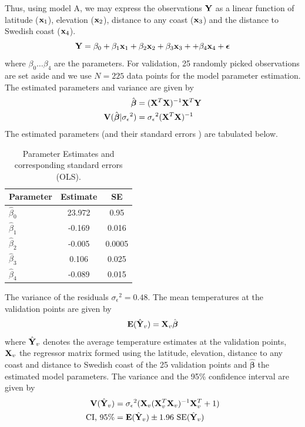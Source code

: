 \documentclass[a4paper,10pt]{article}
\def\bY{{\bf Y}}
\def\bX{{\bf X}}
\def\bE{{\bf E}}
\def\bV{{\bf V}}
\def\bx{{\bf x}}
\def\bbeta{{\boldsymbol \beta}}
\def\sigmaeps{{\sigma_{\epsilon}}}
\begin{document}
Thus, using model A, we may express the observations $\bY$ as a linear function of latitude ($\bx_1$), elevation ($\bx_2$), distance to any coast ($\bx_3$) and the distance to Swedish coast ($\bx_4$).
\begin{equation}
 \bY = \beta_0 + \beta_1 \bx_1 + \beta_2 \bx_2 + \beta_3 \bx_3 + + \beta_4 \bx_4 + {\boldsymbol \epsilon}
\end{equation}
where $\beta_0 \dots \beta_4$ are the parameters. For  validation, 25 randomly picked observations are set aside and we use $N = 225$ data points for the model parameter estimation. The estimated parameters and variance are given by
\begin{align*}
\hat \bbeta &= (\bX^T \bX)^{-1} \bX^T \bY\\
\bV(\hat \bbeta | \sigmaeps^2) &= \sigmaeps^2 (\bX^T \bX)^{-1}
\end{align*}
 The estimated parameters (and their standard errors ) are tabulated below.
\begin{table}[H]
\centering
\begin{tabular}{lcc}
\hline
{\bf Parameter} & {\bf Estimate} & {\bf SE }\\
\hline
$\hat \beta_0$ & 23.972 & 0.95 \\
$\hat \beta_1$ & -0.169 & 0.016\\
$\hat \beta_2$ & -0.005 & 0.0005 \\
$\hat \beta_3$ & 0.106 & 0.025\\
$\hat \beta_4$ & -0.089 & 0.015\\
\hline
\end{tabular}
\caption{Parameter Estimates and corresponding standard errors (OLS).}
\label{tab:olsest}
\end{table}
The variance of the residuals $\sigmaeps^2 = 0.48$. The mean temperatures at the validation points are given by
\begin{equation}
\bE(\hat \bY_v) = \bX_v \hat \bbeta
\end{equation}
where $\hat \bY_v$ denotes the average temperature estimates at the validation points, $\bX_v$  the regressor matrix formed using the latitude, elevation, distance to any coast and distance to Swedish coast of the 25 validation points and $\hat \bbeta$ the estimated model parameters. The variance and the 95\% confidence interval are given by
\begin{align*}
\bV(\hat \bY_v) &= \sigmaeps^2 (\bX_v (\bX_v^T\bX_v)^{-1} \bX_v^T + 1) \\
\text{CI, 95\%} &= \bE(\hat \bY_v) \pm 1.96 \text{ SE}(\hat \bY_v)
\end{align*}
\end{document}
